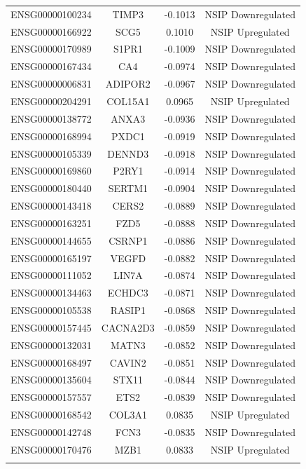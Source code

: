 \documentclass[
]{article}
\begin{document}
\begin{singlespace}
\begin{longtable}[t]{lccc}
ENSG00000100234 & TIMP3 & -0.1013 & NSIP Downregulated\\
\addlinespace
ENSG00000166922 & SCG5 & 0.1010 & NSIP Upregulated\\
ENSG00000170989 & S1PR1 & -0.1009 & NSIP Downregulated\\
ENSG00000167434 & CA4 & -0.0974 & NSIP Downregulated\\
ENSG00000006831 & ADIPOR2 & -0.0967 & NSIP Downregulated\\
ENSG00000204291 & COL15A1 & 0.0965 & NSIP Upregulated\\
\addlinespace
ENSG00000138772 & ANXA3 & -0.0936 & NSIP Downregulated\\
ENSG00000168994 & PXDC1 & -0.0919 & NSIP Downregulated\\
ENSG00000105339 & DENND3 & -0.0918 & NSIP Downregulated\\
ENSG00000169860 & P2RY1 & -0.0914 & NSIP Downregulated\\
ENSG00000180440 & SERTM1 & -0.0904 & NSIP Downregulated\\
\addlinespace
ENSG00000143418 & CERS2 & -0.0889 & NSIP Downregulated\\
ENSG00000163251 & FZD5 & -0.0888 & NSIP Downregulated\\
ENSG00000144655 & CSRNP1 & -0.0886 & NSIP Downregulated\\
ENSG00000165197 & VEGFD & -0.0882 & NSIP Downregulated\\
ENSG00000111052 & LIN7A & -0.0874 & NSIP Downregulated\\
\addlinespace
ENSG00000134463 & ECHDC3 & -0.0871 & NSIP Downregulated\\
ENSG00000105538 & RASIP1 & -0.0868 & NSIP Downregulated\\
ENSG00000157445 & CACNA2D3 & -0.0859 & NSIP Downregulated\\
ENSG00000132031 & MATN3 & -0.0852 & NSIP Downregulated\\
ENSG00000168497 & CAVIN2 & -0.0851 & NSIP Downregulated\\
\addlinespace
ENSG00000135604 & STX11 & -0.0844 & NSIP Downregulated\\
ENSG00000157557 & ETS2 & -0.0839 & NSIP Downregulated\\
ENSG00000168542 & COL3A1 & 0.0835 & NSIP Upregulated\\
ENSG00000142748 & FCN3 & -0.0835 & NSIP Downregulated\\
ENSG00000170476 & MZB1 & 0.0833 & NSIP Upregulated\\
\addlinespace

\end{longtable}
\end{singlespace}
\end{document}
